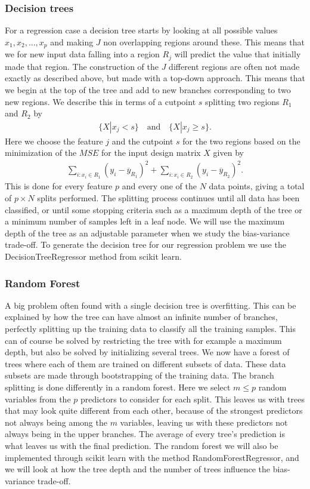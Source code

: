 \documentclass[11pt]{article}
\begin{document}
\subsubsection*{Decision trees}
For a regression case a decision tree starts by looking at all possible values $x_1,x_2,...,x_p$ and making $J$ non overlapping regions around these. This means that we for new input data falling into a region $R_j$ will predict the value that initially made that region. The construction of the $J$ different regions are often not made exactly as described above, but made with a top-down approach. This means that we begin at the top of the tree and add to new branches corresponding to two new regions. We describe this in terms of a cutpoint $s$ splitting two regions $R_1$ and $R_2$ by
\begin{align*}
    \{X|x_j < s\} \quad\text{and}\quad \{X|x_j \geq s\}.
\end{align*}
Here we choose the feature $j$ and the cutpoint $s$ for the two regions based on the minimization of the $MSE$ for the input design matrix $X$ given by
\begin{align*}
    \sum_{i:x_i \in R_1} (y_i - \overline{y}_{R_1})^2  + \sum_{i:x_i \in R_2} (y_i - \overline{y}_{R_2})^2.
\end{align*}
This is done for every feature $p$ and every one of the $N$ data points, giving a total of $p \times N $ splits performed. The splitting process continues until all data has been classified, or until some stopping criteria such as a maximum depth of the tree or a minimum number of samples left in a leaf node. We will use the maximum depth of the tree as an adjustable parameter when we study the bias-variance trade-off. To generate the decision tree for our regression problem we use the DecisionTreeRegressor method from scikit learn.

\subsubsection*{Random Forest}
A big problem often found with a single decision tree is overfitting. This can be explained by how the tree can have almost an infinite number of branches, perfectly splitting up the training data to classify all the training samples. This can of course be solved by restricting the tree with for example a maximum depth, but also be solved by initializing several trees. We now have a forest of trees where each of them are trained on different subsets of data. These data subsets are made through bootstrapping of the training data. The branch splitting is done differently in a random forest. Here we select $m \leq p$ random variables from the $p$ predictors to consider for each split. This leaves us with trees that may look quite different from each other, because of the strongest predictors not always being among the $m$ variables, leaving us with these predictors not always being in the upper branches. The average of every tree's prediction is what leaves us with the final prediction. The random forest we will also be implemented through scikit learn with the method RandomForestRegressor, and we will look at how the tree depth and the number of trees influence the bias-variance trade-off.
\end{document}
